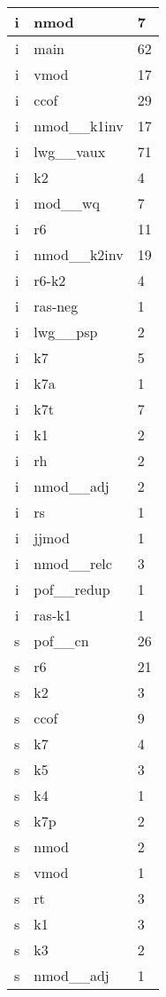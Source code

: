 \documentclass[a4 paper]{article}
\begin{document}
\begin{longtable}{cp{}p{}}
i & nmod & 7\\ \midrule i & main & 62\\ \midrule i & vmod & 17\\ \midrule i & ccof & 29\\ \midrule i & nmod\_\_k1inv & 17\\ \midrule i & lwg\_\_vaux & 71\\ \midrule i & k2 & 4\\ \midrule i & mod\_\_wq & 7\\ \midrule i & r6 & 11\\ \midrule i & nmod\_\_k2inv & 19\\ \midrule i & r6-k2 & 4\\ \midrule i & ras-neg & 1\\ \midrule i & lwg\_\_psp & 2\\ \midrule i & k7 & 5\\ \midrule i & k7a & 1\\ \midrule i & k7t & 7\\ \midrule i & k1 & 2\\ \midrule i & rh & 2\\ \midrule i & nmod\_\_adj & 2\\ \midrule i & rs & 1\\ \midrule i & jjmod & 1\\ \midrule i & nmod\_\_relc & 3\\ \midrule i & pof\_\_redup & 1\\ \midrule i & ras-k1 & 1\\ \midrule 
s & pof\_\_cn & 26\\ \midrule s & r6 & 21\\ \midrule s & k2 & 3\\ \midrule s & ccof & 9\\ \midrule s & k7 & 4\\ \midrule s & k5 & 3\\ \midrule s & k4 & 1\\ \midrule s & k7p & 2\\ \midrule s & nmod & 2\\ \midrule s & vmod & 1\\ \midrule s & rt & 3\\ \midrule s & k1 & 3\\ \midrule s & k3 & 2\\ \midrule s & nmod\_\_adj & 1\\ \midrule 

\end{longtable}
\end{document}
